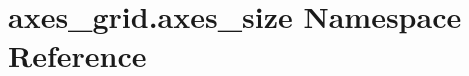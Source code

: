 \hypertarget{namespaceaxes__grid_1_1axes__size}{}\section{axes\+\_\+grid.\+axes\+\_\+size Namespace Reference}
\label{namespaceaxes__grid_1_1axes__size}
